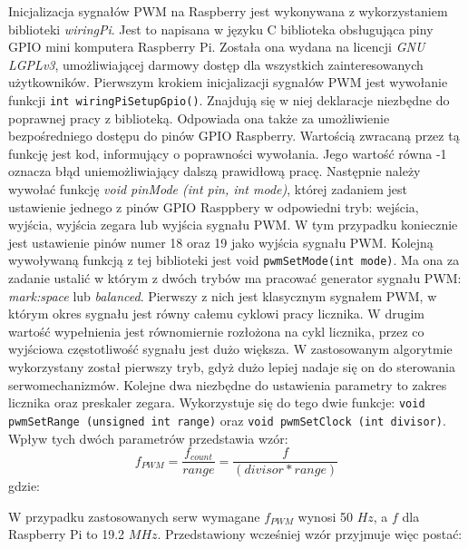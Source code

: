 Inicjalizacja sygnałów PWM na Raspberry jest wykonywana z wykorzystaniem biblioteki \textit{wiringPi}. Jest to napisana w języku C biblioteka obsługująca piny GPIO mini komputera Raspberry Pi. Została ona wydana na licencji \textit{GNU LGPLv3}, umożliwiającej darmowy dostęp dla wszystkich zainteresowanych użytkowników. Pierwszym krokiem inicjalizacji sygnałów PWM jest wywołanie funkcji \texttt{int wiringPiSetupGpio()}. Znajdują się w niej deklaracje niezbędne do poprawnej pracy z biblioteką. Odpowiada ona także za umożliwienie bezpośredniego dostępu do pinów GPIO Raspberry. Wartością zwracaną przez tą funkcję jest kod, informujący o poprawności wywołania. Jego wartość równa -1 oznacza błąd uniemożliwiający dalszą prawidłową pracę. Następnie należy wywołać funkcję \textit{void pinMode (int pin, int mode)}, której zadaniem jest ustawienie jednego z pinów GPIO Rasppbery w odpowiedni tryb: wejścia, wyjścia, wyjścia zegara lub wyjścia sygnału PWM. W tym przypadku koniecznie jest ustawienie pinów numer 18 oraz 19 jako wyjścia sygnału PWM. Kolejną wywoływaną funkcją z tej biblioteki jest void \texttt{pwmSetMode(int mode)}. Ma ona za zadanie ustalić w którym z dwóch trybów ma pracować generator sygnału PWM: \textit{mark:space} lub \textit{balanced}. Pierwszy z nich jest klasycznym sygnałem PWM, w którym okres sygnału jest równy całemu cyklowi pracy licznika. W drugim wartość wypełnienia jest równomiernie rozłożona na cykl licznika, przez co wyjściowa częstotliwość sygnału jest dużo większa. W zastosowanym algorytmie wykorzystany został pierwszy tryb, gdyż dużo lepiej nadaje się on do sterowania serwomechanizmów. Kolejne dwa niezbędne do ustawienia parametry to zakres licznika oraz preskaler zegara. Wykorzystuje się do tego dwie funkcje: \texttt{void pwmSetRange (unsigned int range)} oraz \texttt{void pwmSetClock (int divisor)}. Wpływ tych dwóch parametrów przedstawia wzór:
\begin{equation}
f_{PWM} = \frac{f_{count}}{range} = \frac{f}{(divisor * range)}
\label{eq:hard_pwm}
\end{equation}
gdzie:
\begin{equationDescriptor}
\end{equationDescriptor}
W przypadku zastosowanych serw wymagane $f_{PWM}$ wynosi 50 $Hz$, a $f$ dla Raspberry Pi to 19.2 $MHz$. Przedstawiony wcześniej wzór przyjmuje więc postać:
